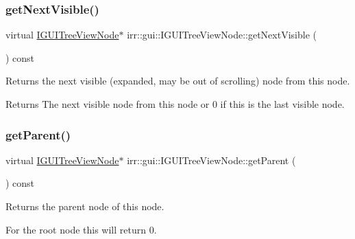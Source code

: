 \subsubsection{\texorpdfstring{get\+Next\+Visible()}{getNextVisible()}}
{\footnotesize\ttfamily virtual \hyperlink{classirr_1_1gui_1_1IGUITreeViewNode}{I\+G\+U\+I\+Tree\+View\+Node}$\ast$ irr\+::gui\+::\+I\+G\+U\+I\+Tree\+View\+Node\+::get\+Next\+Visible (\begin{DoxyParamCaption}{ }\end{DoxyParamCaption}) const\hspace{0.3cm}{\ttfamily [pure virtual]}}



Returns the next visible (expanded, may be out of scrolling) node from this node. 

\begin{DoxyReturn}{Returns}
The next visible node from this node or 0 if this is the last visible node. 
\end{DoxyReturn}
\mbox{\label{classirr_1_1gui_1_1IGUITreeViewNode_a37d30138ae01528cb1213324c511d079}} 
\subsubsection{\texorpdfstring{get\+Parent()}{getParent()}}
{\footnotesize\ttfamily virtual \hyperlink{classirr_1_1gui_1_1IGUITreeViewNode}{I\+G\+U\+I\+Tree\+View\+Node}$\ast$ irr\+::gui\+::\+I\+G\+U\+I\+Tree\+View\+Node\+::get\+Parent (\begin{DoxyParamCaption}{ }\end{DoxyParamCaption}) const\hspace{0.3cm}{\ttfamily [pure virtual]}}



Returns the parent node of this node. 

For the root node this will return 0. \mbox{\label{classirr_1_1gui_1_1IGUITreeViewNode_a41a756203d028a274586203091277aa9}} 
